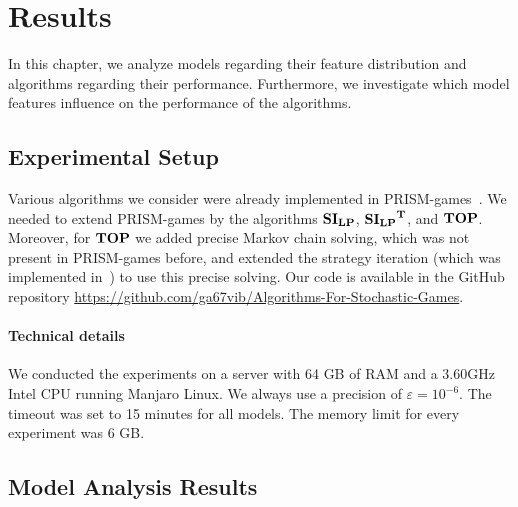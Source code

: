 \chapter{Results} \label{ch:results}

In this chapter, we analyze models regarding their feature distribution and algorithms regarding their performance.
Furthermore, we investigate which model features influence on the performance of the algorithms.



\section{Experimental Setup}
Various algorithms we consider were already implemented in PRISM-games~\cite{prismgames3}.
We needed to extend PRISM-games by the algorithms $\mathbf{SI_{LP}}$, $\mathbf{\mathbf{SI_{LP}}^T}$, and $\mathbf{TOP}$.
Moreover, for $\mathbf{TOP}$ we added precise Markov chain solving, which was not present in PRISM-games before, and extended the strategy iteration (which was implemented in~\cite{gandalf20}) to use this precise solving.
Our code is available in the GitHub repository \url{https://github.com/ga67vib/Algorithms-For-Stochastic-Games}.

\subsubsection*{Technical details}
We conducted the experiments on a server with 64 GB of RAM and a 3.60GHz Intel CPU running Manjaro Linux. %
We always use a precision of $\varepsilon=10^{-6}$. The timeout was set to 15 minutes for all models. 
The memory limit for every experiment was 6 GB.

\section{Model Analysis Results}

